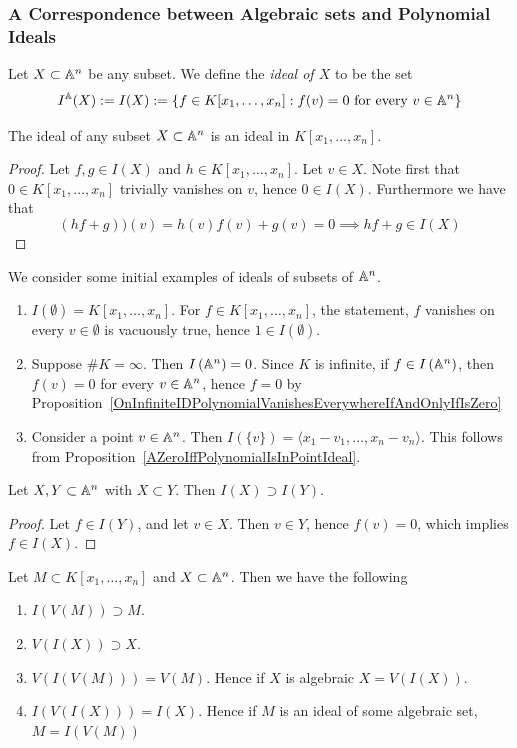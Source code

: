 \subsubsection{A Correspondence between Algebraic sets and Polynomial Ideals}
\begin{definition}
    Let $X \subset \mathbb{A}^n$ be any subset. We define the \textit{ideal of $X$} to be the set
    $$I^{\mathbb{A}}(X) := I(X) := \left\{ f \in K[x_1,\dots,x_n] : f(v) = 0 \text{ for every } v \in \mathbb{A}^n \right\}$$
\end{definition}
\begin{lemma}\label{TheIdealGeneratedBySubsetOfAffineSpaceIsAnIdeal}
    The ideal of any subset $X \subset \mathbb{A}^n$ is an ideal in $K[x_1,\dots,x_n]$. 
\end{lemma}
\begin{proof}
    Let $f,g\in I(X)$ and $h\in K[x_1,\dots,x_n]$. Let $v\in X$. Note first that $0\in K[x_1,\dots,x_n]$ trivially vanishes on $v$, hence $0\in I(X)$. Furthermore we have that 
    $$
        (hf+g))(v)= h(v)f(v)+g(v) = 0 \implies hf+g \in I(X)
    $$    
\end{proof}
\begin{example}
    We consider some initial examples of ideals of subsets of $\mathbb{A}^n$. 
    \begin{enumerate}
        \item $I(\emptyset) = K[x_1,\dots,x_n]$. For $f\in K[x_1,\dots,x_n]$, the statement, $f$ vanishes on every $v\in \emptyset$ is vacuously true, hence $1\in I(\emptyset)$.
        \item Suppose $\#K=\infty$. Then $I\left(\mathbb{A}^n\right) = 0$. Since $K$ is infinite, if $f\in I\left(\mathbb{A}^n\right)$, then $f(v) = 0$ for every $v\in \mathbb{A}^n$, hence $f = 0$ by Proposition~\ref{OnInfiniteIDPolynomialVanishesEverywhereIfAndOnlyIfIsZero}
        \item Consider a point $v\in \mathbb{A}^n$. Then $I(\{v\}) = \langle x_1-v_1,\dots,x_n-v_n\rangle$. This follows from Proposition~\ref{AZeroIffPolynomialIsInPointIdeal}.
    \end{enumerate}
\end{example}
\begin{lemma}\label{SubsetIdealSuperset}
    Let $X,Y\subset \mathbb{A}^n$ with $X \subset Y$. Then $I(X)\supset I(Y)$. 
\end{lemma}
\begin{proof}
    Let $f \in I(Y)$, and let $v \in X$. Then $v\in Y$, hence $f(v)=0$, which implies $f\in I(X)$.
\end{proof}
\begin{lemma}\label{IdealVanishingSets}
    Let $M \subset K[x_1,\dots,x_n]$ and $X\subset \mathbb{A}^n$. Then we have the following
    \begin{enumerate}
        \item $I(V(M)) \supset M$.
        \item $V(I(X)) \supset X$.
        \item $V(I(V(M)))=V(M)$. Hence if $X$ is algebraic $X=V(I(X))$.
        \item $I(V(I(X)))=I(X)$. Hence if $M$ is an ideal of some algebraic set, $M= I(V(M))$
    \end{enumerate}
\end{lemma}
